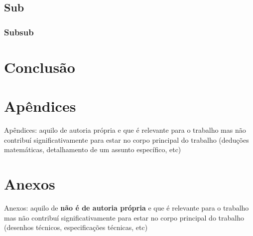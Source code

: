 \documentclass[12pt,a4paper,oneside,english,brazil]{abntex2}
\begin{document}
	\section{Sub}
	\lipsum[11]
	\subsection{Subsub}
	\lipsum[12]
	
	\chapter{Conclusão}
	\lipsum[13-16]
	
	\postextual
	\printbibliography[title=\texorpdfstring{\MakeTextUppercase{\bibname}}{\bibname}]
	\apendices
	\chapter{Apêndices}
	Apêndices: aquilo de autoria própria e que é relevante para o trabalho mas não contribuí significativamente para estar no corpo principal do trabalho (deduções matemáticas, detalhamento de um assunto específico, etc)
	
	\anexos
	\chapter{Anexos}
	Anexos: aquilo de \textbf{não é de autoria própria} e que é relevante para o trabalho mas não contribuí significativamente para estar no corpo principal do trabalho (desenhos técnicos, especificações técnicas, etc)
\end{document}
